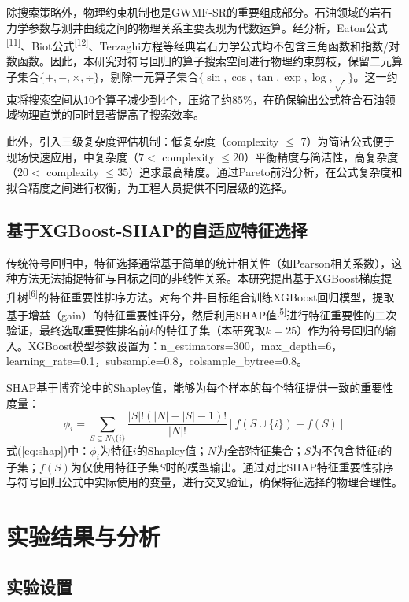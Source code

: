 \documentclass[a4paper,12pt]{ctexart}
\begin{document}
除搜索策略外，物理约束机制也是GWMF-SR的重要组成部分。石油领域的岩石力学参数与测井曲线之间的物理关系主要表现为代数运算。经分析，Eaton公式\textsuperscript{[11]}、Biot公式\textsuperscript{[12]}、Terzaghi方程等经典岩石力学公式均不包含三角函数和指数/对数函数。因此，本研究对符号回归的算子搜索空间进行物理约束剪枝，保留二元算子集合$\{+, -, \times, \div\}$，剔除一元算子集合$\{\sin, \cos, \tan, \exp, \log, \sqrt{~}\}$。这一约束将搜索空间从10个算子减少到4个，压缩了约85\%，在确保输出公式符合石油领域物理直觉的同时显著提高了搜索效率。

此外，引入三级复杂度评估机制：低复杂度（complexity $\leq$ 7）为简洁公式便于现场快速应用，中复杂度（$7 <$ complexity $\leq 20$）平衡精度与简洁性，高复杂度（$20 <$ complexity $\leq 35$）追求最高精度。通过Pareto前沿分析，在公式复杂度和拟合精度之间进行权衡，为工程人员提供不同层级的选择。

\subsection{基于XGBoost-SHAP的自适应特征选择}

传统符号回归中，特征选择通常基于简单的统计相关性（如Pearson相关系数），这种方法无法捕捉特征与目标之间的非线性关系。本研究提出基于XGBoost梯度提升树\textsuperscript{[6]}的特征重要性排序方法。对每个井-目标组合训练XGBoost回归模型，提取基于增益（gain）的特征重要性评分，然后利用SHAP值\textsuperscript{[5]}进行特征重要性的二次验证，最终选取重要性排名前$k$的特征子集（本研究取$k=25$）作为符号回归的输入。XGBoost模型参数设置为：n\_estimators=300，max\_depth=6，learning\_rate=0.1，subsample=0.8，colsample\_bytree=0.8。

SHAP基于博弈论中的Shapley值，能够为每个样本的每个特征提供一致的重要性度量：
\begin{equation}
  \phi_i = \sum_{S \subseteq N \setminus \{i\}} \frac{|S|!(|N|-|S|-1)!}{|N|!} [f(S \cup \{i\}) - f(S)] \tag{9}
  \label{eq:shap}
\end{equation}
式(\ref{eq:shap})中：$\phi_i$为特征$i$的Shapley值；$N$为全部特征集合；$S$为不包含特征$i$的子集；$f(S)$为仅使用特征子集$S$时的模型输出。通过对比SHAP特征重要性排序与符号回归公式中实际使用的变量，进行交叉验证，确保特征选择的物理合理性。

\section{实验结果与分析}

\subsection{实验设置}
\end{document}
